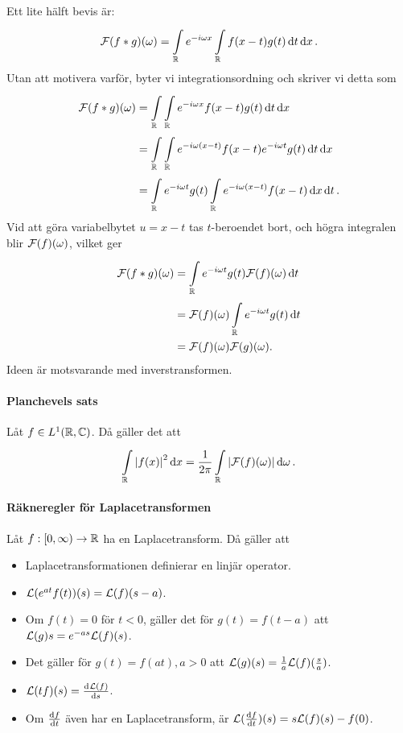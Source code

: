 \proof
Ett lite hälft bevis är:
\begin{align*}
	\mathcal{F}(f * g)(\omega) = \int\limits_{\mathbb{R}}^{}e^{-i\omega x}\int\limits_{\mathbb{R}}^{}f(x - t)g(t)\dd{t}\dd{x}.
\end{align*}
Utan att motivera varför, byter vi integrationsordning och skriver vi detta som
\begin{align*}
	\mathcal{F}(f * g)(\omega) &= \int\limits_{\mathbb{R}}^{}\int\limits_{\mathbb{R}}^{}e^{-i\omega x}f(x - t)g(t)\dd{t}\dd{x} \\
	                          &= \int\limits_{\mathbb{R}}^{}\int\limits_{\mathbb{R}}^{}e^{-i\omega(x - t)}f(x - t)e^{-i\omega t}g(t)\dd{t}\dd{x} \\
	                          &= \int\limits_{\mathbb{R}}^{}e^{-i\omega t}g(t)\int\limits_{\mathbb{R}}^{}e^{-i\omega(x - t)}f(x - t)\dd{x}\dd{t}.
\end{align*}
Vid att göra variabelbytet $u = x - t$ tas $t$-beroendet bort, och högra integralen blir $\mathcal{F}(f)(\omega)$, vilket ger
\begin{align*}
	\mathcal{F}(f * g)(\omega) &= \int\limits_{\mathbb{R}}^{}e^{-i\omega t}g(t)\mathcal{F}(f)(\omega)\dd{t} \\
	                          &= \mathcal{F}(f)(\omega)\int\limits_{\mathbb{R}}^{}e^{-i\omega t}g(t)\dd{t} \\
	                          &= \mathcal{F}(f)(\omega)\mathcal{F}(g)(\omega).
\end{align*}
Ideen är motsvarande med inverstransformen.

\paragraph{Planchevels sats}
Låt $f\in L^{1}(\mathbb{R}, \mathbb{C})$. Då gäller det att
\begin{align*}
	\int\limits_{\mathbb{R}}^{}\abs{f(x)}^{2}\dd{x} = \frac{1}{2\pi}\int\limits_{\mathbb{R}}^{}\abs{\mathcal{F}(f)(\omega)}\dd{\omega}.
\end{align*}

\proof

\paragraph{Räkneregler för Laplacetransformen}
Låt $f: [0, \infty)\to\mathbb{R}$ ha en Laplacetransform. Då gäller att
\begin{itemize}
	\item Laplacetransformationen definierar en linjär operator.
	\item $\mathcal{L}(e^{at}f(t))(s) = \mathcal{L}(f)(s - a)$.
	\item Om $f(t) = 0$ för $t < 0$, gäller det för $g(t) = f(t - a)$ att $\mathcal{L}(g){s} = e^{-as}\mathcal{L}(f)(s)$.
	\item Det gäller för $g(t) = f(at), a > 0$ att $\mathcal{L}(g)(s) = \frac{1}{a}\mathcal{L}(f)(\frac{s}{a})$.
	\item $\mathcal{L}(tf)(s) = \dv[]{\mathcal{L}(f)}{s} (s)$.
	\item Om $\dv{f}{t}$ även har en Laplacetransform, är $\mathcal{L}(\dv{f}{t})(s) = s\mathcal{L}(f)(s) - f(0)$.
\end{itemize}

